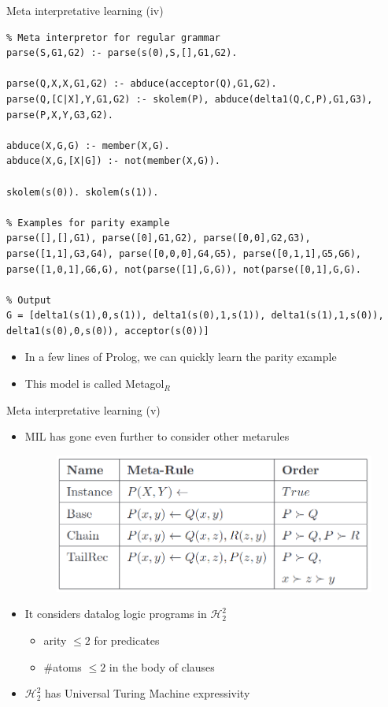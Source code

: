 \begin{frame}[fragile]{Meta interpretative learning (iv)}
\vspace{-.5cm}
\begin{verbatim}
% Meta interpretor for regular grammar
parse(S,G1,G2) :- parse(s(0),S,[],G1,G2).

parse(Q,X,X,G1,G2) :- abduce(acceptor(Q),G1,G2).
parse(Q,[C|X],Y,G1,G2) :- skolem(P), abduce(delta1(Q,C,P),G1,G3), parse(P,X,Y,G3,G2).

abduce(X,G,G) :- member(X,G).
abduce(X,G,[X|G]) :- not(member(X,G)).

skolem(s(0)). skolem(s(1)).

% Examples for parity example
parse([],[],G1), parse([0],G1,G2), parse([0,0],G2,G3), parse([1,1],G3,G4), parse([0,0,0],G4,G5), parse([0,1,1],G5,G6), parse([1,0,1],G6,G), not(parse([1],G,G)), not(parse([0,1],G,G).

% Output
G = [delta1(s(1),0,s(1)), delta1(s(0),1,s(1)), delta1(s(1),1,s(0)), delta1(s(0),0,s(0)), acceptor(s(0))]
\end{verbatim}
\vspace{-.6cm}
\begin{itemize}
    \item In a few lines of Prolog, we can quickly learn the parity example
    \item This model is called Metagol$_R$
\end{itemize}
\end{frame}



\begin{frame}{Meta interpretative learning (v)}
\begin{itemize}
    \item MIL has gone even further to consider other metarules
    \begin{figure}
        \centering
        \includegraphics[width=.6\textwidth]{images/newmetarules.png}
    \end{figure}
    \item It considers datalog logic programs in $\mathcal{H}_2^2$
    \begin{itemize}
        \item arity $\leq2$ for predicates
        \item \#atoms $\leq2$ in the body of clauses
    \end{itemize}
    \item $\mathcal{H}_2^2$ has Universal Turing Machine expressivity
\end{itemize}    
\end{frame}

